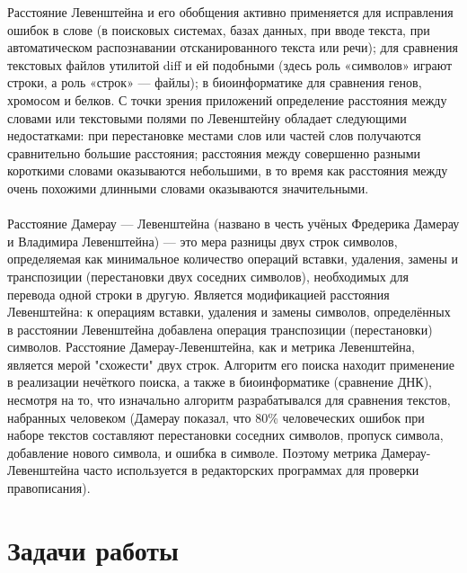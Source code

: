 \documentclass[a4paper, 14pt]{article}
\begin{document}
Расстояние Левенштейна и его обобщения активно применяется для исправления ошибок в слове (в поисковых системах, базах данных, при вводе текста, при автоматическом распознавании отсканированного текста или речи); для сравнения текстовых файлов утилитой diff и ей подобными (здесь роль «символов» играют строки, а роль «строк» — файлы); в биоинформатике для сравнения генов, хромосом и белков\cite{lev_2}.
С точки зрения приложений определение расстояния между словами или текстовыми полями по Левенштейну обладает следующими недостатками: при перестановке местами слов или частей слов получаются сравнительно большие расстояния; расстояния между совершенно разными короткими словами оказываются небольшими, в то время как расстояния между очень похожими длинными словами оказываются значительными.\\\\
Расстояние Дамерау — Левенштейна (названо в честь учёных Фредерика Дамерау и Владимира Левенштейна) — это мера разницы двух строк символов, определяемая как минимальное количество операций вставки, удаления, замены и транспозиции (перестановки двух соседних символов), необходимых для перевода одной строки в другую. Является модификацией расстояния Левенштейна: к операциям вставки, удаления и замены символов, определённых в расстоянии Левенштейна добавлена операция транспозиции (перестановки) символов. Расстояние Дамерау-Левенштейна, как и метрика Левенштейна, является мерой "схожести" двух строк. Алгоритм его поиска находит применение в реализации нечёткого поиска, а также в биоинформатике (сравнение ДНК), несмотря на то, что изначально алгоритм разрабатывался для сравнения текстов, набранных человеком (Дамерау показал, что 80\% человеческих ошибок при наборе текстов составляют перестановки соседних символов, пропуск символа, добавление нового символа, и ошибка в символе. Поэтому метрика Дамерау-Левенштейна часто используется в редакторских программах для проверки правописания).

\newpage
\section*{Задачи работы}
\end{document}
